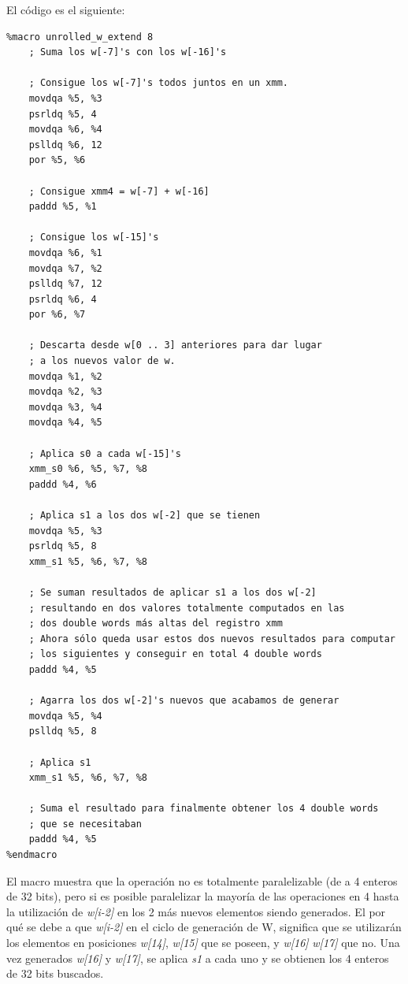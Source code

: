 \documentclass[a4paper, 10pt, twoside]{article}
\begin{document}
El código es el siguiente:

\begin{verbatim}
%macro unrolled_w_extend 8
    ; Suma los w[-7]'s con los w[-16]'s

    ; Consigue los w[-7]'s todos juntos en un xmm.
    movdqa %5, %3
    psrldq %5, 4
    movdqa %6, %4
    pslldq %6, 12
    por %5, %6

    ; Consigue xmm4 = w[-7] + w[-16]
    paddd %5, %1

    ; Consigue los w[-15]'s
    movdqa %6, %1
    movdqa %7, %2
    pslldq %7, 12
    psrldq %6, 4
    por %6, %7

    ; Descarta desde w[0 .. 3] anteriores para dar lugar
    ; a los nuevos valor de w.
    movdqa %1, %2
    movdqa %2, %3
    movdqa %3, %4
    movdqa %4, %5

    ; Aplica s0 a cada w[-15]'s
    xmm_s0 %6, %5, %7, %8
    paddd %4, %6

    ; Aplica s1 a los dos w[-2] que se tienen
    movdqa %5, %3
    psrldq %5, 8
    xmm_s1 %5, %6, %7, %8

    ; Se suman resultados de aplicar s1 a los dos w[-2]
    ; resultando en dos valores totalmente computados en las
    ; dos double words más altas del registro xmm
    ; Ahora sólo queda usar estos dos nuevos resultados para computar
    ; los siguientes y conseguir en total 4 double words
    paddd %4, %5

    ; Agarra los dos w[-2]'s nuevos que acabamos de generar
    movdqa %5, %4
    pslldq %5, 8

    ; Aplica s1
    xmm_s1 %5, %6, %7, %8

    ; Suma el resultado para finalmente obtener los 4 double words
    ; que se necesitaban
    paddd %4, %5
%endmacro
\end{verbatim}

El macro muestra que la operación no es totalmente paralelizable (de a 4 enteros de 32 bits), pero si es posible paralelizar la mayoría de las operaciones en 4 hasta la utilización de \textit{w[i-2]} en los 2 más nuevos elementos siendo generados. El por qué se debe a que \textit{w[i-2]} en el ciclo de generación de W, significa que se utilizarán los elementos en posiciones \textit{w[14]}, \textit{w[15]} que se poseen, y \textit{w[16]} \textit{w[17]} que no. Una vez generados \textit{w[16]} y \textit{w[17]}, se aplica \textit{s1} a cada uno y se obtienen los 4 enteros de 32 bits buscados.
\end{document}
